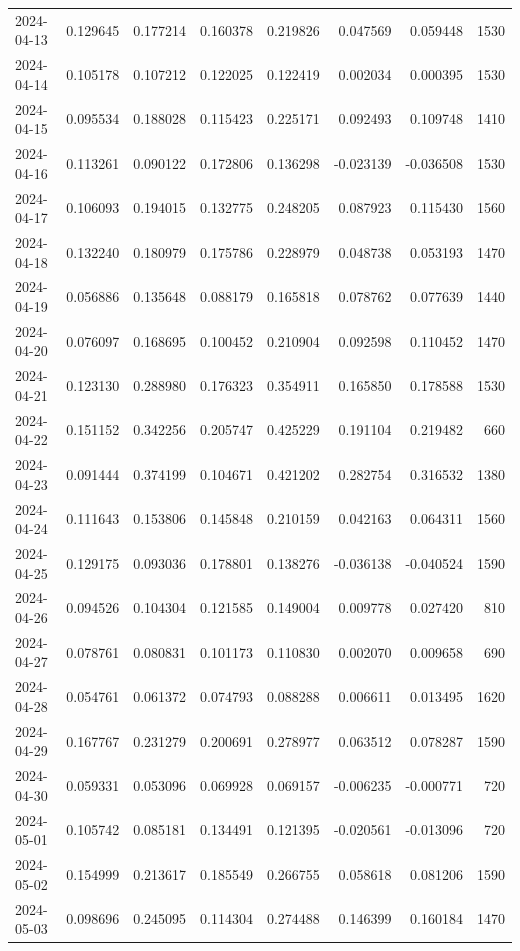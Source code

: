 \begin{tabular}{lrrrrrrr}
2024-04-13 & 0.129645 & 0.177214 & 0.160378 & 0.219826 & 0.047569 & 0.059448 & 1530 \\
2024-04-14 & 0.105178 & 0.107212 & 0.122025 & 0.122419 & 0.002034 & 0.000395 & 1530 \\
2024-04-15 & 0.095534 & 0.188028 & 0.115423 & 0.225171 & 0.092493 & 0.109748 & 1410 \\
2024-04-16 & 0.113261 & 0.090122 & 0.172806 & 0.136298 & -0.023139 & -0.036508 & 1530 \\
2024-04-17 & 0.106093 & 0.194015 & 0.132775 & 0.248205 & 0.087923 & 0.115430 & 1560 \\
2024-04-18 & 0.132240 & 0.180979 & 0.175786 & 0.228979 & 0.048738 & 0.053193 & 1470 \\
2024-04-19 & 0.056886 & 0.135648 & 0.088179 & 0.165818 & 0.078762 & 0.077639 & 1440 \\
2024-04-20 & 0.076097 & 0.168695 & 0.100452 & 0.210904 & 0.092598 & 0.110452 & 1470 \\
2024-04-21 & 0.123130 & 0.288980 & 0.176323 & 0.354911 & 0.165850 & 0.178588 & 1530 \\
2024-04-22 & 0.151152 & 0.342256 & 0.205747 & 0.425229 & 0.191104 & 0.219482 & 660 \\
2024-04-23 & 0.091444 & 0.374199 & 0.104671 & 0.421202 & 0.282754 & 0.316532 & 1380 \\
2024-04-24 & 0.111643 & 0.153806 & 0.145848 & 0.210159 & 0.042163 & 0.064311 & 1560 \\
2024-04-25 & 0.129175 & 0.093036 & 0.178801 & 0.138276 & -0.036138 & -0.040524 & 1590 \\
2024-04-26 & 0.094526 & 0.104304 & 0.121585 & 0.149004 & 0.009778 & 0.027420 & 810 \\
2024-04-27 & 0.078761 & 0.080831 & 0.101173 & 0.110830 & 0.002070 & 0.009658 & 690 \\
2024-04-28 & 0.054761 & 0.061372 & 0.074793 & 0.088288 & 0.006611 & 0.013495 & 1620 \\
2024-04-29 & 0.167767 & 0.231279 & 0.200691 & 0.278977 & 0.063512 & 0.078287 & 1590 \\
2024-04-30 & 0.059331 & 0.053096 & 0.069928 & 0.069157 & -0.006235 & -0.000771 & 720 \\
2024-05-01 & 0.105742 & 0.085181 & 0.134491 & 0.121395 & -0.020561 & -0.013096 & 720 \\
2024-05-02 & 0.154999 & 0.213617 & 0.185549 & 0.266755 & 0.058618 & 0.081206 & 1590 \\
2024-05-03 & 0.098696 & 0.245095 & 0.114304 & 0.274488 & 0.146399 & 0.160184 & 1470 \\

\end{tabular}

